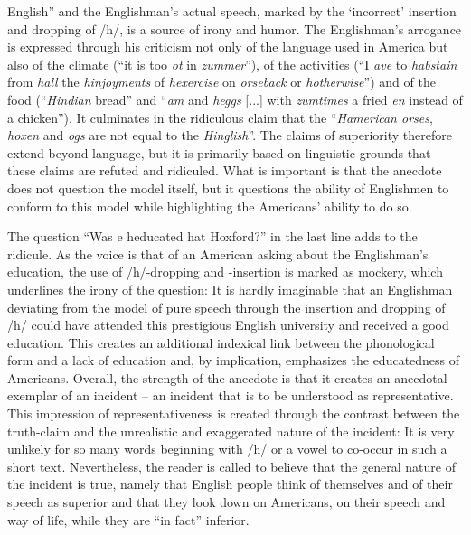 English” and the Englishman’s actual speech, marked by the ‘incorrect’ insertion and dropping of /h/, is a source of irony and humor. The Englishman’s arrogance is expressed through his criticism not only of the language used in America but also of the climate (“it is too \emph{ot} in \emph{zummer}”), of the activities (“I \emph{ave} to \emph{habstain} from \emph{hall} the \emph{hinjoyments} of \emph{hexercise} on \emph{orseback} or \emph{hotherwise}”) and of the food (“\emph{Hindian} bread” and “\emph{am} and \emph{heggs} [...] with \emph{zumtimes} a fried \emph{en} instead of a chicken”). It culminates in the ridiculous claim that the “\emph{Hamerican orses}, \emph{hoxen} and \emph{ogs} are not equal to the \emph{Hinglish}”. The claims of superiority therefore extend beyond language, but it is primarily based on linguistic grounds that these claims are refuted and ridiculed. What is important is that the anecdote does not question the model itself, but it questions the ability of Englishmen to conform to this model while highlighting the Americans’ ability to do so.

The question “Was e heducated hat Hoxford?” in the last line adds to the ridicule. As the voice is that of an American asking about the Englishman’s education, the use of /h/-dropping and -insertion is marked as mockery, which underlines the irony of the question: It is hardly imaginable \-that an Englishman deviating from the model of pure speech through the insertion and dropping of /h/ could have attended this prestigious English university and received a good education. This creates an additional indexical link between the phonological form and a lack of education and, by implication, emphasizes the educatedness of Americans. Overall, the strength of the anecdote is that it creates an anecdotal exemplar of an incident – an incident that is to be understood as representative. This impression of representativeness is created through the contrast between the truth-claim and the unrealistic and exaggerated nature of the incident: It is very unlikely for so many words beginning with /h/ or a vowel to co-occur in such a short text. Nevertheless, the reader is called to believe that the general nature of the incident is true, namely that English people think of themselves and of their speech as superior and that they look down on Americans, on their speech and way of life, while they are “in fact” inferior.

